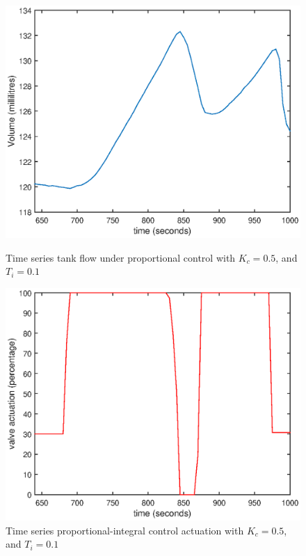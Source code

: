 \documentclass{article}
\begin{document}
\begin{figure}[h]
	\centering
	\begin{minipage}{0.45\textwidth}
		\centering
		\includegraphics[scale=0.4]{PI_Kc_05_Ti_01}
		\caption{Time series tank flow under proportional control with $K_c = 0.5$, and $T_i = 0.1$}
	\end{minipage}
	\hspace{0.5cm}
	\begin{minipage}{0.45\textwidth}
		\centering
		\includegraphics[scale=0.4]{PI_Kc_05_Ti_01_control}
		\caption{Time series proportional-integral control actuation with $K_c = 0.5$, and $T_i = 0.1$}
	\end{minipage}
\end{figure}
\end{document}
